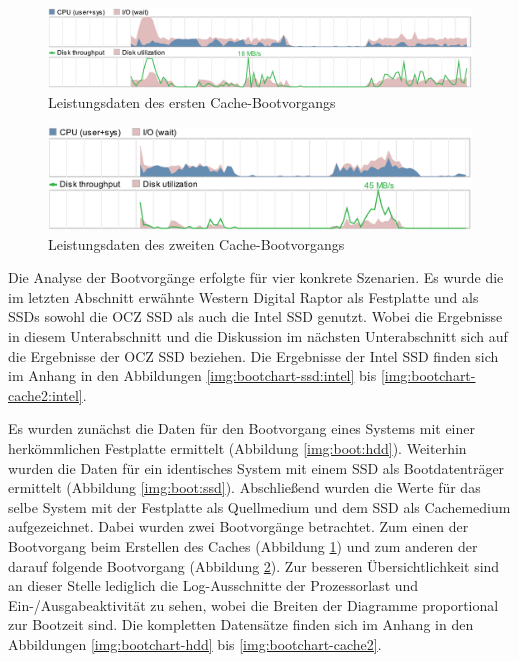 \begin{figure}[b!]
    \includegraphics[scale=0.543]{figures/chapter7/boot-cache1}%
    \caption{Leistungsdaten des ersten Cache-Bootvorgangs}
    \label{img:boot:cache1}
\end{figure}

\begin{figure}[b!]
    \includegraphics[scale=0.543]{figures/chapter7/boot-cache2}%
    \caption{Leistungsdaten des zweiten Cache-Bootvorgangs}
    \label{img:boot:cache2}
\end{figure}

Die Analyse der Bootvorgänge erfolgte für vier konkrete Szenarien. Es wurde die im letzten Abschnitt erwähnte Western Digital Raptor als Festplatte
und als \acp{SSD} sowohl die OCZ SSD als auch die Intel SSD genutzt. Wobei die Ergebnisse in diesem Unterabschnitt und die Diskussion im nächsten Unterabschnitt
sich auf die Ergebnisse der OCZ \ac{SSD} beziehen. Die Ergebnisse der Intel \ac{SSD} finden sich im Anhang in den Abbildungen \ref{img:bootchart-ssd:intel} bis
\ref{img:bootchart-cache2:intel}.

Es wurden zunächst die Daten für den Bootvorgang eines Systems mit einer herkömmlichen Festplatte ermittelt (Abbildung \ref{img:boot:hdd}). Weiterhin wurden die
Daten für ein identisches System mit einem \ac{SSD} als Bootdatenträger ermittelt (Abbildung \ref{img:boot:ssd}). Abschließend wurden die Werte für das selbe
System mit der Festplatte als Quellmedium und dem \ac{SSD} als Cachemedium aufgezeichnet. Dabei wurden zwei Bootvorgänge betrachtet. Zum einen der Bootvorgang
beim Erstellen des Caches (Abbildung \ref{img:boot:cache1}) und zum anderen der darauf folgende Bootvorgang (Abbildung \ref{img:boot:cache2}). Zur besseren
Übersichtlichkeit sind an dieser Stelle lediglich die Log-Ausschnitte der Prozessorlast und Ein-/Ausgabeaktivität zu sehen, wobei die Breiten der Diagramme
proportional zur Bootzeit sind. Die kompletten Datensätze finden sich im Anhang in den Abbildungen \ref{img:bootchart-hdd} bis \ref{img:bootchart-cache2}.

